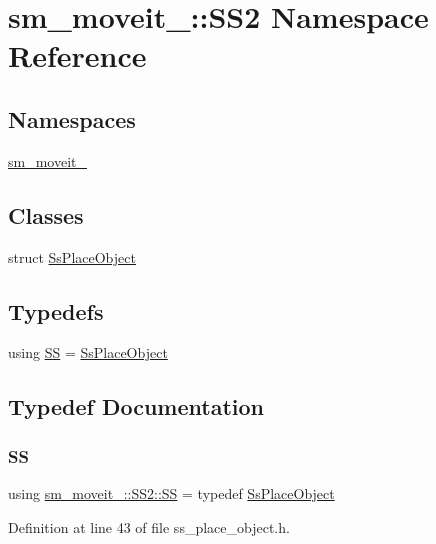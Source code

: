 \hypertarget{namespacesm__moveit__4_1_1SS2}{}\section{sm\+\_\+moveit\+\_\+:\+:S\+S2 Namespace Reference}
\label{namespacesm__moveit__4_1_1SS2}
\subsection*{Namespaces}
\begin{DoxyCompactItemize}
\item 
 \hyperlink{namespacesm__moveit__4_1_1SS2_1_1sm__moveit__4}{sm\+\_\+moveit\+\_}
\end{DoxyCompactItemize}
\subsection*{Classes}
\begin{DoxyCompactItemize}
\item 
struct \hyperlink{structsm__moveit__4_1_1SS2_1_1SsPlaceObject}{Ss\+Place\+Object}
\end{DoxyCompactItemize}
\subsection*{Typedefs}
\begin{DoxyCompactItemize}
\item 
using \hyperlink{namespacesm__moveit__4_1_1SS2_a8bb28676d9e86a665ec0700d6712e817}{SS} = \hyperlink{structsm__moveit__4_1_1SS2_1_1SsPlaceObject}{Ss\+Place\+Object}
\end{DoxyCompactItemize}


\subsection{Typedef Documentation}
\mbox{\label{namespacesm__moveit__4_1_1SS2_a8bb28676d9e86a665ec0700d6712e817}} 
\subsubsection{\texorpdfstring{SS}{SS}}
{\footnotesize\ttfamily using \hyperlink{namespacesm__moveit__4_1_1SS2_a8bb28676d9e86a665ec0700d6712e817}{sm\+\_\+moveit\+\_\+::\+S\+S2\+::\+SS} = typedef \hyperlink{structsm__moveit__4_1_1SS2_1_1SsPlaceObject}{Ss\+Place\+Object}}



Definition at line 43 of file ss\+\_\+place\+\_\+object.\+h.

